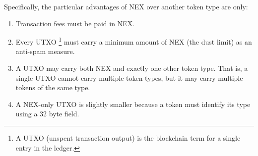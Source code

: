 \documentclass[a4paper, 11pt]{article}
\begin{document}
Specifically, the particular advantages of NEX over another token type are only:
\begin{enumerate}
    \item Transaction fees must be paid in NEX. 
    \item Every UTXO \footnote{A UTXO (unspent transaction output) is the blockchain term for a single entry in the ledger.} must carry a minimum amount of NEX (the dust limit) as an anti-spam measure.
    \item A UTXO may carry both NEX and exactly one other token type.  That is, a single UTXO cannot carry multiple token types, but it may carry multiple tokens of the same type.
    \item A NEX-only UTXO is slightly smaller because a token must identify its type using a 32 byte field.
\end{enumerate}
\end{document}
